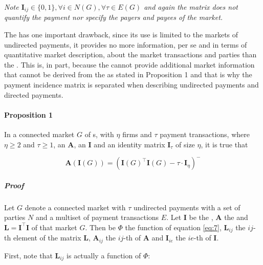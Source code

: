 \documentclass[12pt]{article}
\begin{document}
\begin{multicols}{2}
\begin{mdframed}
\emph{ Note $\textbf{I}_{ij} \in \{0, 1\}, \forall i \in N(G), \forall \tau \in E(G)$ and again the matrix does not quantify the payment nor specify the payers and payees of the market.}

\end{mdframed}

The  has one important drawback, since its use is limited to the markets of undirected payments, it provides no more information, per se and in terms of quantitative market description, about the market transactions and parties than the . This is, in part, because the  cannot provide additional market information that cannot be derived from the  as stated in Proposition 1 and that is why the payment incidence matrix is separated when describing undirected payments and directed payments.

\paragraph{Proposition 1} In a connected market $G$ of s, with $\eta$ firms and $\tau$ payment transactions, where $\eta \geq 2$ and $\tau \geq 1$, an  $\textbf{A}$,  an  $\textbf{I}$ and an identity matrix $\textbf{I}_{\tau}$ of size $\eta$, it is true that

\begin{equation} \label{9}
    \textbf{A}(\textbf{I}(G)) = (\textbf{I}(G)^{\top} \textbf{I}(G) - \tau \cdot \textbf{I}_{\eta})^{-}
\end{equation}

\subparagraph{Proof} Let $G$ denote a connected market with $\tau$ undirected payments with a set of parties $N$ and a multiset of payment transactions $E$. Let $\textbf{I}$ be the , $\textbf{A}$ the  and $\textbf{L} = \textbf{I}^{\top} \textbf{I}$ of that market $G$. Then be $\Phi$ the function of equation \ref{eq:7}, $\textbf{L}_{ij}$ the $ij$-th element of the matrix $\textbf{L}$, $\textbf{A}_{ij}$ the $ij$-th of $\textbf{A}$ and $\textbf{I}_{ie}$ the $ie$-th of $\textbf{I}$. 

First, note that $\textbf{L}_{ij}$ is actually a function of $\Phi$:


\end{multicols}
\end{document}
